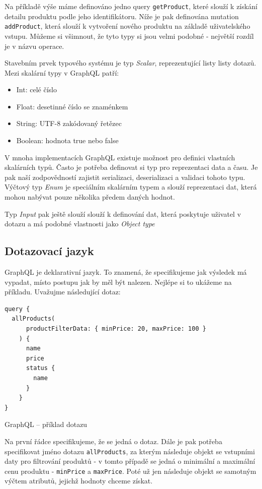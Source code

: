 \documentclass[thesis=M,czech]{FITthesis}[2019/12/23]
\begin{document}
Na příkladě výše máme definováno jedno query \texttt{getProduct}, které slouží k získání detailu produktu podle jeho identifikátoru. Níže je pak definována mutation \texttt{addProduct}, která slouží k vytvoření nového produktu na základě uživatelského vstupu. Můžeme si všimnout, že tyto typy si jsou velmi podobné - největší rozdíl je v názvu operace.

Stavebním prvek typového systému je typ \textit{Scalar}, reprezentující listy listy dotazů. Mezi skalární typy v GraphQL patří:
\begin{itemize}
    \item Int: celé číslo
    \item Float: desetinné číslo se znaménkem
    \item String: UTF-8 zakódovaný řetězec
    \item Boolean: hodnota true nebo false
\end{itemize}
V mnoha implementacích GraphQL existuje možnost pro definici vlastních skalárních typů. Často je potřeba definovat si typ pro reprezentaci data a času. Je pak naší zodpovědností zajistit serializaci, deserializaci a validaci tohoto typu. Výčtový typ \textit{Enum} je speciálním skalárním typem a slouží reprezentaci dat, která mohou nabývat pouze několika předem daných hodnot. 

Typ \textit{Input} pak ještě slouží slouží k definování dat, která poskytuje uživatel v dotazu a má podobné vlastnosti jako \textit{Object type}

\subsection{Dotazovací jazyk}
GraphQL je deklarativní jazyk. To znamená, že specifikujeme jak výsledek má vypadat, místo postupu jak by měl být nalezen. Nejlépe si to ukážeme na příkladu. Uvažujme následující dotaz:

\begin{listing}[H]
\begin{verbatim}
query {
  allProducts(
      productFilterData: { minPrice: 20, maxPrice: 100 }
    ) {
      name
      price
      status {
        name
      }
    }
}
\end{verbatim}
\caption{GraphQL -- příklad dotazu}
\label{lst:graphql_query_example}
\end{listing}

Na první řádce specifikujeme, že se jedná o dotaz. Dále je pak potřeba specifikovat jméno dotazu \texttt{allProducts}, za kterým následuje objekt se vstupními daty pro filtrování produktů - v tomto případě se jedná o minimální a maximální cenu produktu - \texttt{minPrice} a \texttt{maxPrice}. Poté už jen následuje objekt se samotným výčtem atributů, jejichž hodnoty chceme získat.
\end{document}
